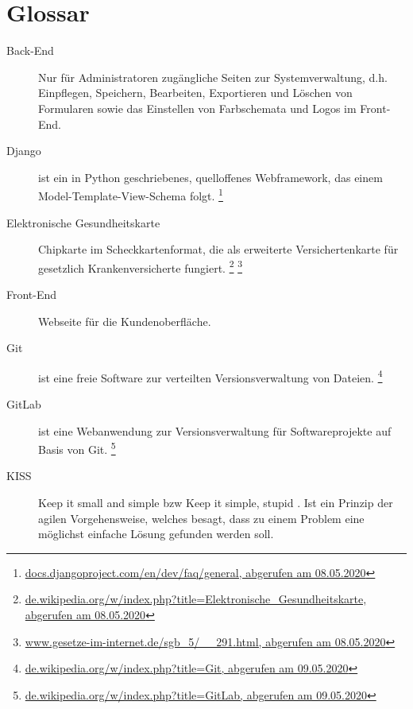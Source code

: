 \section{Glossar}

\begin{description}
  \item[Back-End]
    Nur für Administratoren zugängliche Seiten zur Systemverwaltung, d.h. Einpflegen, Speichern, Bearbeiten, Exportieren und Löschen von Formularen sowie das Einstellen von Farbschemata und Logos im Front-End.
 
  \item[Django]
    ist ein in Python geschriebenes, quelloffenes Webframework, das einem Model-Template-View-Schema folgt.
    \footnote{\href{https://docs.djangoproject.com/en/dev/faq/general}{docs.djangoproject.com/en/dev/faq/general, abgerufen am 08.05.2020}}

 \item[Elektronische Gesundheitskarte]
    Chipkarte im Scheckkartenformat, die als erweiterte Versichertenkarte für gesetzlich Krankenversicherte fungiert.
    \footnote{\href{https://de.wikipedia.org/w/index.php?title=Elektronische_Gesundheitskarte&oldid=198562236}{de.wikipedia.org/w/index.php?title=Elektronische\_Gesundheitskarte,  abgerufen am 08.05.2020}}
    \footnote{\href{https://www.gesetze-im-internet.de/sgb_5/__291.html}{www.gesetze-im-internet.de/sgb\_5/\_\_291.html, abgerufen am 08.05.2020}}
 
  \item[Front-End]
    Webseite für die Kundenoberfläche.
    
  \item[Git]
    ist eine freie Software zur verteilten Versionsverwaltung von Dateien.
    \footnote{\href{https://de.wikipedia.org/w/index.php?title=Git&oldid=199354247}{de.wikipedia.org/w/index.php?title=Git, abgerufen am 09.05.2020}}
    
  \item[GitLab]
    ist eine Webanwendung zur Versionsverwaltung für Softwareprojekte auf Basis von Git.
    \footnote{\href{https://de.wikipedia.org/w/index.php?title=GitLab&oldid=196028257}{de.wikipedia.org/w/index.php?title=GitLab, abgerufen am 09.05.2020}}
    
  \item[KISS]
    \glqq Keep it small and simple \grqq{} bzw \glqq Keep it simple, stupid \grqq{}. Ist ein Prinzip der agilen Vorgehensweise, welches besagt, dass zu einem Problem eine möglichst einfache Lösung gefunden werden soll.


\end{description}
